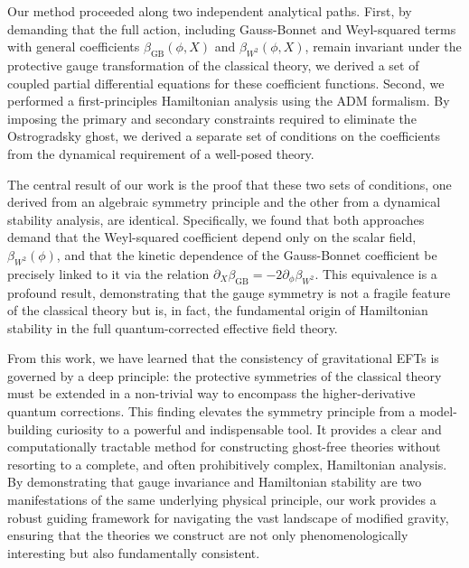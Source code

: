\documentclass[twocolumn]{aastex631}
\begin{document}
Our method proceeded along two independent analytical paths. First, by demanding that the full action, including Gauss-Bonnet and Weyl-squared terms with general coefficients $\beta_{\text{GB}}(\phi, X)$ and $\beta_{W^2}(\phi, X)$, remain invariant under the protective gauge transformation of the classical theory, we derived a set of coupled partial differential equations for these coefficient functions. Second, we performed a first-principles Hamiltonian analysis using the ADM formalism. By imposing the primary and secondary constraints required to eliminate the Ostrogradsky ghost, we derived a separate set of conditions on the coefficients from the dynamical requirement of a well-posed theory.

The central result of our work is the proof that these two sets of conditions, one derived from an algebraic symmetry principle and the other from a dynamical stability analysis, are identical. Specifically, we found that both approaches demand that the Weyl-squared coefficient depend only on the scalar field, $\beta_{W^2}(\phi)$, and that the kinetic dependence of the Gauss-Bonnet coefficient be precisely linked to it via the relation $\partial_X \beta_{\text{GB}} = -2 \partial_\phi \beta_{W^2}$. This equivalence is a profound result, demonstrating that the gauge symmetry is not a fragile feature of the classical theory but is, in fact, the fundamental origin of Hamiltonian stability in the full quantum-corrected effective field theory.

From this work, we have learned that the consistency of gravitational EFTs is governed by a deep principle: the protective symmetries of the classical theory must be extended in a non-trivial way to encompass the higher-derivative quantum corrections. This finding elevates the symmetry principle from a model-building curiosity to a powerful and indispensable tool. It provides a clear and computationally tractable method for constructing ghost-free theories without resorting to a complete, and often prohibitively complex, Hamiltonian analysis. By demonstrating that gauge invariance and Hamiltonian stability are two manifestations of the same underlying physical principle, our work provides a robust guiding framework for navigating the vast landscape of modified gravity, ensuring that the theories we construct are not only phenomenologically interesting but also fundamentally consistent.

{}

\end{document}
